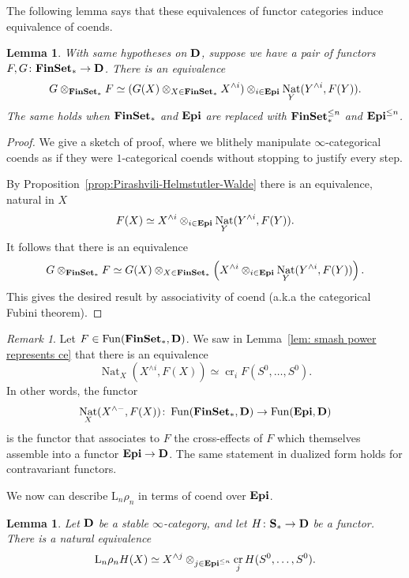 \documentclass[psamsfonts]{amsart}
\theoremstyle{plain}
\newtheorem{lem}[thm]{Lemma}
\theoremstyle{definition}
\theoremstyle{remark}
\newtheorem{rem}[thm]{Remark}
\newcommand{\catname}[1]{{\normalfont\textbf{#1}}}
\newcommand{\finset}{\catname{FinSet}_*}
\newcommand{\epi}{\catname{Epi}}
\newcommand{\spaces}{\catname{S}_*}
\newcommand{\lkan}{\mathrm{L}}
\DeclareMathOperator{\nat}{Nat}
\DeclareMathOperator{\fun}{Fun}
\DeclareMathOperator{\ce}{cr}
\begin{document}
The following lemma says that these equivalences of functor categories induce equivalence of coends.
\begin{lem}\label{lem:DK coend}
With same hypotheses on $\catname{D}$, suppose we have a pair of functors $F, G\colon \finset\to \catname{D}$. There is an equivalence
\[
G\otimes_{\finset} F\simeq (G(X)\otimes_{X\in \finset}X^{\wedge i})\otimes_{i\in \epi} \nat_{Y}(Y^{\wedge i}, F(Y)).
\]
The same holds when $\finset$ and $\epi$ are replaced with $\finset^{\le n}$ and $\epi^{\le n}$.
\end{lem}
\begin{proof}
We give a sketch of proof, where we blithely manipulate $\infty$-categorical coends as if they were $1$-categorical coends without stopping to justify every step. 

By Proposition~\ref{prop:Pirashvili-Helmstutler-Walde} there is an equivalence, natural in $X$
\[
F(X)\simeq X^{\wedge i}\otimes_{i\in \epi}\nat_Y(Y^{\wedge i}, F(Y)).
\]
It follows that there is an equivalence
\[
G\otimes_{\finset} F\simeq G(X)\otimes_{X\in \finset}\left(X^{\wedge i}\otimes_{i\in \epi}\nat_Y(Y^{\wedge i}, F(Y))\right).
\]
This gives the desired result by associativity of coend (a.k.a the categorical Fubini theorem).
\end{proof}
\begin{rem}
Let $F\in \fun(\finset, \catname{D})$. We saw in Lemma~\ref{lem: smash power represents ce} that there is an equivalence
\[
\nat_X(X^{\wedge i}, F(X))\simeq \ce_iF(S^0, \ldots, S^0).
\]
In other words, the functor
\[
\nat_X(X^{\wedge -}, F(X))\colon \fun(\finset, \catname{D})\to \fun(\epi, \catname{D})
\]
is the functor that associates to $F$ the cross-effects of $F$ which themselves assemble into a functor $\epi\to\catname{D}$. The same statement in dualized form holds for contravariant functors. 
\end{rem}
We now can describe $\lkan_n\rho_n$ in terms of coend over $\epi$.
\begin{lem}\label{lem:epi model for left Kan}
Let $\catname{D}$ be a stable $\infty$-category, and let $H\colon \spaces\to \catname{D}$ be a functor. There is a natural equivalence
\[
\lkan_n\rho_n H(X) \simeq X^{\wedge j} \otimes_{j\in \epi^{\le n}} \ce_jH(S^0, \ldots, S^0).
\]
\end{lem}
\end{document}
